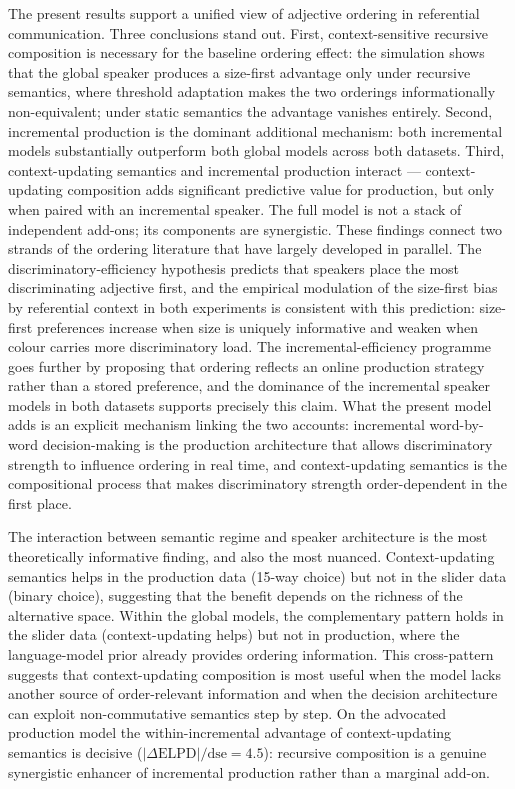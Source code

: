 \documentclass[man,floatsintext]{apa7}
\begin{document}
The present results support a unified view of adjective ordering in referential communication.
Three conclusions stand out.
First, context-sensitive recursive composition is necessary for the baseline ordering effect: the simulation shows that the global speaker produces a size-first advantage only under recursive semantics, where threshold adaptation makes the two orderings informationally non-equivalent; under static semantics the advantage vanishes entirely.
Second, incremental production is the dominant additional mechanism: both incremental models substantially outperform both global models across both datasets.
Third, context-updating semantics and incremental production interact --- context-updating composition adds significant predictive value for production, but only when paired with an incremental speaker.
The full model is not a stack of independent add-ons; its components are synergistic.
These findings connect two strands of the ordering literature that have largely developed in parallel.
The discriminatory-efficiency hypothesis \citep{fukumura2018ordering} predicts that speakers place the most discriminating adjective first, and the empirical modulation of the size-first bias by referential context in both experiments is consistent with this prediction: size-first preferences increase when size is uniquely informative and weaken when colour carries more discriminatory load.
The incremental-efficiency programme \citep{rubio2021wordorder} goes further by proposing that ordering reflects an online production strategy rather than a stored preference, and the dominance of the incremental speaker models in both datasets supports precisely this claim.
What the present model adds is an explicit mechanism linking the two accounts: incremental word-by-word decision-making is the production architecture that allows discriminatory strength to influence ordering in real time, and context-updating semantics is the compositional process that makes discriminatory strength order-dependent in the first place.

The interaction between semantic regime and speaker architecture is the most theoretically informative finding, and also the most nuanced.
Context-updating semantics helps in the production data (15-way choice) but not in the slider data (binary choice), suggesting that the benefit depends on the richness of the alternative space.
Within the global models, the complementary pattern holds in the slider data (context-updating helps) but not in production, where the language-model prior already provides ordering information.
This cross-pattern suggests that context-updating composition is most useful when the model lacks another source of order-relevant information and when the decision architecture can exploit non-commutative semantics step by step.
On the advocated production model the within-incremental advantage of context-updating semantics is decisive ($|\Delta\text{ELPD}|/\text{dse}=4.5$): recursive composition is a genuine synergistic enhancer of incremental production rather than a marginal add-on.
\end{document}

